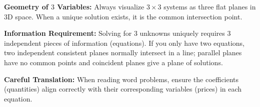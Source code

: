 \begin{takeaways}
\item \textbf{Geometry of $3$ Variables:} Always visualize $3 \times 3$ systems as three flat planes in 3D space. When a unique solution exists, it is the common intersection point.
\item \textbf{Information Requirement:} Solving for 3 unknowns uniquely requires 3 independent pieces of information (equations). If you only have two equations, two independent consistent planes normally intersect in a line; parallel planes have no common points and coincident planes give a plane of solutions.
\item \textbf{Careful Translation:} When reading word problems, ensure the coefficients (quantities) align correctly with their corresponding variables (prices) in each equation.
\end{takeaways}
